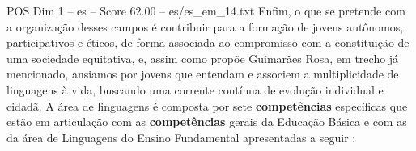 \begin{textsample}{POS Dim 1 – es – Score 62.00 – es/es\_em\_14.txt}
Enfim, o que se pretende com a organização desses campos é contribuir para a formação de jovens autônomos, participativos e éticos, de forma associada ao compromisso com a constituição de uma sociedade equitativa, e, assim como propõe Guimarães Rosa, em trecho já mencionado, ansiamos por jovens que entendam e associem a multiplicidade de linguagens à vida, buscando uma corrente contínua de evolução individual e cidadã.
A área de linguagens é composta por sete \textbf{competências} específicas que estão em articulação com as \textbf{competências} gerais da Educação Básica e com as da área de Linguagens do Ensino Fundamental apresentadas a seguir :

\end{textsample}
